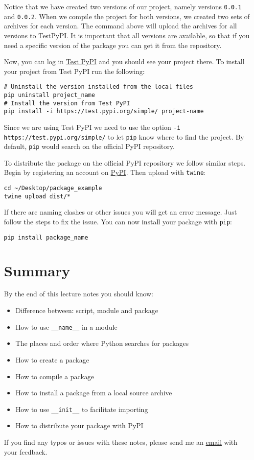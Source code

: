 \documentclass[12pt, a4paper]{article}
\begin{document}
Notice that we have created two versions of our project, namely versions \texttt{0.0.1} and \texttt{0.0.2}.
When we compile the project for both versions, we created two sets of archives for each version.
The command above will upload the archives for all versions to TestPyPI.
It is important that all versions are available, so that if you need a specific version of the package you can get it from the repository.

Now, you can log in \href{https://test.pypi.org/manage/projects/}{Test PyPI} and you should see your project there.
To install your project from Test PyPI run the following:
\lstset{language=bash,label= ,caption= ,captionpos=b,numbers=none}
\begin{lstlisting}
# Uninstall the version installed from the local files
pip uninstall project_name
# Install the version from Test PyPI
pip install -i https://test.pypi.org/simple/ project-name
\end{lstlisting}
Since we are using Test PyPI we need to use the option \texttt{-i https://test.pypi.org/simple/} to let \texttt{pip} know where to find the project.
By default, \texttt{pip} would search on the official PyPI repository.

To distribute the package on the official PyPI repository we follow similar steps.
Begin by registering an account on \href{https://pypi.org/account/register/}{PyPI}.
Then upload with \texttt{twine}:
\lstset{language=bash,label= ,caption= ,captionpos=b,numbers=none}
\begin{lstlisting}
cd ~/Desktop/package_example
twine upload dist/*
\end{lstlisting}
If there are naming clashes or other issues you will get an error message.
Just follow the steps to fix the issue.
You can now install your package with \texttt{pip}:
\lstset{language=bash,label= ,caption= ,captionpos=b,numbers=none}
\begin{lstlisting}
pip install package_name
\end{lstlisting}
\section*{Summary}
\label{sec:org2241670}
By the end of this lecture notes you should know:
\begin{itemize}
\item Difference between: script, module and package
\item How to use \texttt{\_\_name\_\_} in a module
\item The places and order where Python searches for packages
\item How to create a package
\item How to compile a package
\item How to install a package from a local source archive
\item How to use \texttt{\_\_init\_\_} to facilitate importing
\item How to distribute your package with PyPI
\end{itemize}
If you find any typos or issues with these notes, please send me an \href{mailto:guilhermesalome@gmail.com?subject=Feedback: Python: Topic: Creating and Distributing Packages}{email} with your feedback.
\end{document}
